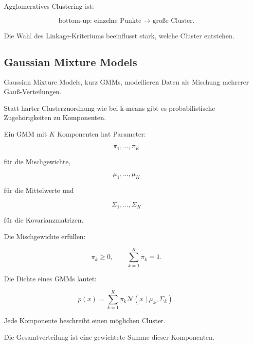\documentclass[11pt,a4paper]{scrartcl}
\begin{document}
\begin{answerbox}
    Agglomeratives Clustering ist:

    \[
        \boxed{
            \text{bottom-up: einzelne Punkte } \longrightarrow \text{ große Cluster.}
        }
    \]

    Die Wahl des Linkage-Kriteriums beeinflusst stark, welche Cluster entstehen.
\end{answerbox}

\subsection{Gaussian Mixture Models}

\begin{notebox}
    Gaussian Mixture Models, kurz GMMs, modellieren Daten als Mischung mehrerer
    Gauß-Verteilungen.

    Statt harter Clusterzuordnung wie bei k-means gibt es probabilistische
    Zugehörigkeiten zu Komponenten.
\end{notebox}

\begin{solutionbox}
    Ein GMM mit \(K\) Komponenten hat Parameter:

    \[
        \pi_1,\dots,\pi_K
    \]

    für die Mischgewichte,

    \[
        \mu_1,\dots,\mu_K
    \]

    für die Mittelwerte und

    \[
        \Sigma_1,\dots,\Sigma_K
    \]

    für die Kovarianzmatrizen.

    Die Mischgewichte erfüllen:

    \[
        \pi_k \geq 0,
        \qquad
        \sum_{k=1}^{K}\pi_k=1.
    \]
\end{solutionbox}

\begin{calculationbox}
    Die Dichte eines GMMs lautet:

    \[
        p(x)
        =
        \sum_{k=1}^{K}
        \pi_k
        \mathcal{N}(x\mid \mu_k,\Sigma_k).
    \]

    Jede Komponente beschreibt einen möglichen Cluster.

    Die Gesamtverteilung ist eine gewichtete Summe dieser Komponenten.
\end{calculationbox}
\end{document}
